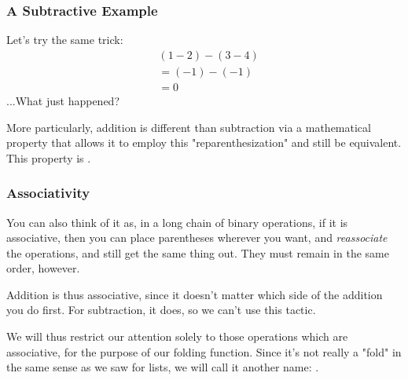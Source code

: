 \documentclass[aspectratio=169, handout]{beamer}
\begin{document}
\begin{frame}[fragile]
  \frametitle{A Subtractive Example}

  Let's try the same trick:
  \pause
  \begin{align*}
    & (1 - 2) - (3 - 4) \\
    &= (-1) - (-1) \\
    &= 0
  \end{align*}
  \pause
  ...What just happened?

  \pause
  \vspace{\fill}


  \pause
  \vspace{\fill}

  More particularly, addition is different than subtraction via a mathematical
  property that allows it to employ this "reparenthesization" and still be
  equivalent. This property is .
\end{frame}

\begin{frame}[fragile]
  \frametitle{Associativity}


  \pause
  \vspace{\fill}

  You can also think of it as, in a long chain of binary operations, if it
  is associative, then you can place parentheses wherever you want, and
  \textit{reassociate} the operations, and still get the same thing out.
  They must remain in the same order, however.

  \pause
  \vspace{\fill}

  Addition is thus associative, since it doesn't matter which side of the
  addition you do first. For subtraction, it does, so we can't use this
  tactic.

  \pause
  \vspace{\fill}

  We will thus restrict our attention solely to those operations which
  are associative, for the purpose of our folding function. Since it's
  not really a "fold" in the same sense as we saw for lists, we will call
  it another name: .
\end{frame}
\end{document}
